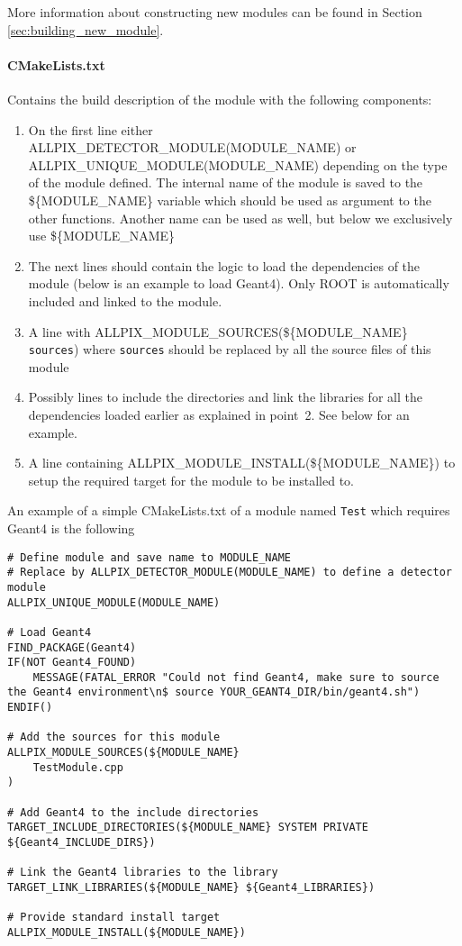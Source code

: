 More information about constructing new modules can be found in Section \ref{sec:building_new_module}.

\paragraph{CMakeLists.txt}
Contains the build description of the module with the following components:
\begin{enumerate}
\item On the first line either ALLPIX\_DETECTOR\_MODULE(MODULE\_NAME) or \\ ALLPIX\_UNIQUE\_MODULE(MODULE\_NAME) depending on the type of the module defined. The internal name of the module is saved to the \$\{MODULE\_NAME\} variable which should be used as argument to the other functions. Another name can be used as well, but below we exclusively use \$\{MODULE\_NAME\}
\item The next lines should contain the logic to load the dependencies of the module (below is an example to load Geant4). Only ROOT is automatically included and linked to the module.
\item A line with ALLPIX\_MODULE\_SOURCES(\$\{MODULE\_NAME\} \texttt{sources}) where \texttt{sources} should be replaced by all the source files of this module
\item Possibly lines to include the directories and link the libraries for all the dependencies loaded earlier as explained in point~2. See below for an example.
\item A line containing ALLPIX\_MODULE\_INSTALL(\$\{MODULE\_NAME\}) to setup the required target for the module to be installed to.
\end{enumerate}

An example of a simple CMakeLists.txt of a module named \texttt{Test} which requires Geant4 is the following
\vspace{5pt}

\begin{verbatim}
# Define module and save name to MODULE_NAME
# Replace by ALLPIX_DETECTOR_MODULE(MODULE_NAME) to define a detector module
ALLPIX_UNIQUE_MODULE(MODULE_NAME) 

# Load Geant4
FIND_PACKAGE(Geant4)
IF(NOT Geant4_FOUND)
    MESSAGE(FATAL_ERROR "Could not find Geant4, make sure to source the Geant4 environment\n$ source YOUR_GEANT4_DIR/bin/geant4.sh")
ENDIF()

# Add the sources for this module
ALLPIX_MODULE_SOURCES(${MODULE_NAME} 
    TestModule.cpp
)

# Add Geant4 to the include directories
TARGET_INCLUDE_DIRECTORIES(${MODULE_NAME} SYSTEM PRIVATE ${Geant4_INCLUDE_DIRS})

# Link the Geant4 libraries to the library
TARGET_LINK_LIBRARIES(${MODULE_NAME} ${Geant4_LIBRARIES})

# Provide standard install target
ALLPIX_MODULE_INSTALL(${MODULE_NAME})
\end{verbatim}

